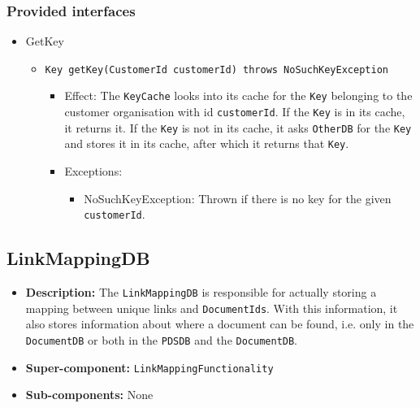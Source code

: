 \documentclass[a4paper,10pt]{article}
\begin{document}
\subsubsection*{Provided interfaces}
\begin{itemize}
    \item GetKey
    \begin{itemize}
        \item \texttt{Key getKey(CustomerId customerId) throws NoSuchKeyException}
        \begin{itemize}
            \item Effect: The \texttt{KeyCache} looks into its cache for the \texttt{Key} belonging to the customer organisation with id \texttt{customerId}. If the \texttt{Key} is in its cache, it returns it. If the \texttt{Key} is not in its cache, it asks \texttt{OtherDB} for the \texttt{Key} and stores it in its cache, after which it returns that \texttt{Key}.
            \item Exceptions:
            \begin{itemize}
                \item NoSuchKeyException: Thrown if there is no key for the given \texttt{customerId}.
            \end{itemize}
        \end{itemize}
    \end{itemize}
\end{itemize}

\subsection{LinkMappingDB}
\begin{itemize}
    \item \textbf{Description:} The \texttt{LinkMappingDB} is responsible for actually storing a mapping between unique links and \texttt{DocumentIds}. With this information, it also stores information about where a document can be found, i.e. only in the \texttt{DocumentDB} or both in the \texttt{PDSDB} and the \texttt{DocumentDB}.
    \item \textbf{Super-component:} \texttt{LinkMappingFunctionality}
    \item \textbf{Sub-components:} None
\end{itemize}
\end{document}
